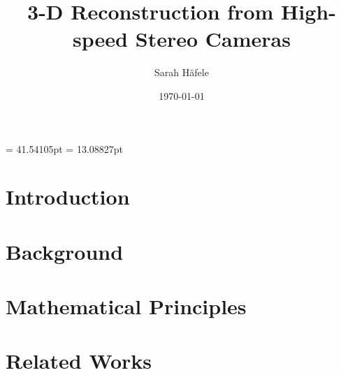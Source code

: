 

\evensidemargin = 41.54105pt
\oddsidemargin  = 13.08827pt


\presentdate{\today}						%
{}					%

\author{Sarah Häfele}
\title{3-D Reconstruction from High-speed Stereo Cameras}
\subject{Master-Thesis}
\publishers{Hochschule Furtwangen\\Fakultät Digitale Medien}
\date{\today}



\frontmatter
\maketitle					%
\clearpage
\clearpage
\tableofcontents			%

\mainmatter
\chapter{Introduction}\label{c:Intro}

\chapter{Background}\label{c:Background}
			

\chapter{Mathematical Principles}\label{c:Math}

\chapter{Related Works}\label{c:relatedWorks}
